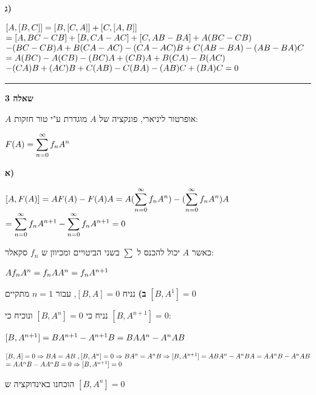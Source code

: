 \documentclass[14pt]{extarticle}
\makeatletter
\newenvironment{lefteqs}{%
    \begin{english}%
    \begin{flushleft}%
    \renewcommand{\arraystretch}{1.3}%
    $\begin{array}{@{}l@{}}%
}{%
    \end{array}$%
    \end{flushleft}%
    \end{english}%
}
\makeatother
\begin{document}
\textbf{ג)}

\begin{lefteqs}
    [A,[B,C]] = [B,[C,A]] + [C,[A,B]] \\
    = [A,BC-CB] + [B,CA-AC] + [C, AB-BA] + A(BC-CB) \\
    - (BC-CB)A + B(CA-AC) - (CA-AC)B + C(AB-BA) - (AB-BA)C \\
    = A(BC) - A(CB) - (BC)A + (CB)A + B(CA) - B(AC)\\
    - (CA)B + (AC)B + C(AB)- C(BA) - (AB)C + (BA)C = 0
\end{lefteqs}

\vspace{3em}
\hrule
\vspace{2em}

\textbf{\large שאלה 3}

$A$ אופרטור ליניארי, פונקציה של $A$ מוגדרת ע"י טור חזקות:
\begin{lefteqs}
    F(A) = \displaystyle\sum_{n=0}^\infty f_n A^n
\end{lefteqs}

\textbf{א)}

\begin{lefteqs}
    [A,F(A)] = AF(A) - F(A)A = A(\displaystyle\sum_{n=0}^\infty f_n A^n) - (\displaystyle\sum_{n=0}^\infty f_n A^n)A \\
    = \displaystyle\sum_{n=0}^\infty f_n A^{n+1} - \displaystyle\sum_{n=0}^\infty f_n A^{n+1} = 0
\end{lefteqs}

כאשר $A$  יכול להכנס ל $\displaystyle\sum$ בשני הביטויים ומכיוון ש $f_n$ סקאלר:
\begin{lefteqs}
    A f_n A^n = f_n A A^n = f_n A^{n+1}
\end{lefteqs}

\textbf{ב)}
נניח $[B,A]=0$, עבור $n=1$ מתקיים $[B,A^1]=0$

נניח כי $[B,A^n]=0$ ונוכיח כי $[B,A^{n+1}]=0$:

\begin{lefteqs}
    [B,A^{n+1}] = BA^{n+1} - A^{n+1}B = BAA^n - A^n AB \\
\end{lefteqs}

\begin{lefteqs}
    [B,A]=0 \Rightarrow BA = AB \,\, , 
    [B,A^n]=0 \Rightarrow BA^n = A^n B
    \Rightarrow [B,A^{n+1}] = ABA^n - A^nBA=AA^nB - A^nAB \\
    = AA^nB - AA^nB = 0 \Rightarrow [B,A^{n+1}] = 0
\end{lefteqs}
הוכחנו באינדוקציה ש $[B,A^n]=0$
\end{document}
